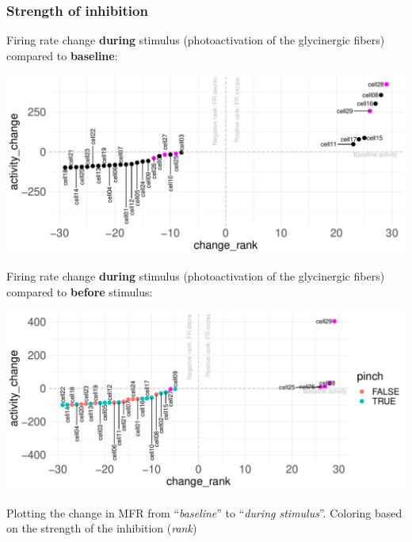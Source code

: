 \documentclass[12pt,]{article}
\begin{document}
\hypertarget{strength-of-inhibition}{%
\subsubsection{Strength of inhibition}\label{strength-of-inhibition}}

Firing rate change \textbf{during} stimulus (photoactivation of the
glycinergic fibers) compared to \textbf{baseline}:

\includegraphics{GII_analysis_notebook_files/figure-latex/unnamed-chunk-15-1.pdf}

Firing rate change \textbf{during} stimulus (photoactivation of the
glycinergic fibers) compared to \textbf{before} stimulus:

\includegraphics{GII_analysis_notebook_files/figure-latex/unnamed-chunk-16-1.pdf}

Plotting the change in MFR from ``\emph{baseline}'' to ``\emph{during
stimulus}''. Coloring based on the strength of the inhibition
(\emph{rank})
\end{document}
